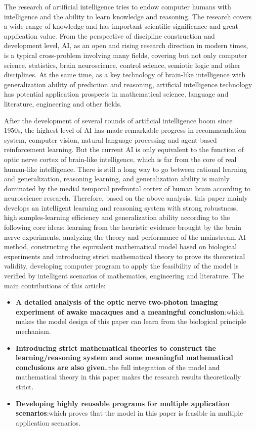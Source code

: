 \begin{enabstract}
The research of artificial intelligence tries to endow computer humans with intelligence and the ability to learn knowledge and reasoning. The research covers a wide range of knowledge and has important scientific significance and great application value. From the perspective of discipline construction and development level, AI, as an open and rising research direction in modern times, is a typical cross-problem involving many fields, covering but not only computer science, statistics, brain neuroscience, control science, semiotic logic and other disciplines. At the same time, as a key technology of brain-like intelligence with generalization ability of prediction and reasoning, artificial intelligence technology has potential application prospects in mathematical science, language and literature, engineering and other fields.

After the development of several rounds of artificial intelligence boom since 1950s, the highest level of AI has made remarkable progress in recommendation system, computer vision, natural language processing and agent-based reinforcement learning. But the current AI is only equivalent to the function of optic nerve cortex of brain-like intelligence, which is far from the core of real human-like intelligence. There is still a long way to go between rational learning and generalization, reasoning learning, and generalization ability is mainly dominated by the medial temporal prefrontal cortex of human brain according to neuroscience research. Therefore, based on the above analysis, this paper mainly develops an intelligent learning and reasoning system with strong robustness, high samples-learning efficiency and generalization ability according to the following core ideas: learning from the heuristic evidence brought by the brain nerve experiments, analyzing the theory and performance of the mainstream AI method, constructing the equivalent mathematical model based on biological experiments and introducing strict mathematical theory to prove its theoretical validity, developing computer program to apply the feasibility of the model is verified by intelligent scenarios of mathematics, engineering and literature. The main contributions of this article:

  \begin{itemize}
  \item \textbf{A detailed analysis of the optic nerve two-photon imaging experiment of awake macaques and a meaningful conclusion}:which makes the model design of this paper can learn from the biological principle mechanism.
  \item \textbf{Introducing strict mathematical theories to construct the learning/reasoning system and some meaningful mathematical conclusions are also given.}:the full integration of the model and mathematical theory in this paper makes the research results theoretically strict.
  \item \textbf{Developing highly reusable programs for multiple application scenarios}:which proves that the model in this paper is feasible in multiple application scenarios.
  \end{itemize}


\end{enabstract}
